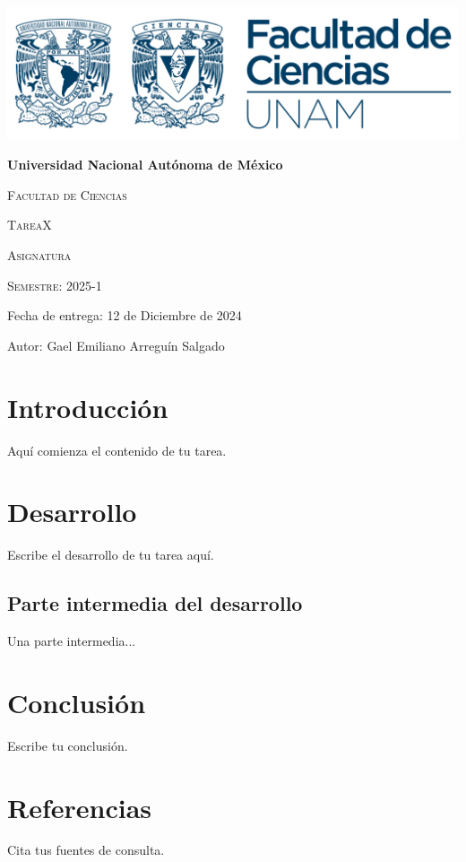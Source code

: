 \documentclass[a4paper, 12pt]{article} %
\newcommand{\makecoverpage}[5]{
  \begin{titlepage}
    \begin{center}
      {\includegraphics[width=1\textwidth]{UNAM_FCLogo}\par}
      \vspace{1cm}
      {\bfseries \huge Universidad Nacional Autónoma de México \par}
      \vspace{2cm}
      {\scshape \huge Facultad de Ciencias \par}
      \vspace{2cm}
      {\scshape \huge #1 \par} %
      \vspace{2cm}
      {\scshape \large #2 \par} %
      \vfill
      {\scshape \large Semestre: #3 \par}
      \vspace{1.5cm}
      {\large Fecha de entrega: #4 \par}
      \vspace{1.5cm}
      {\large Autor: #5 \par}
      \vfill
    \end{center}
  \end{titlepage}
}
\begin{document}
\makecoverpage{TareaX}
              {Asignatura}              
              {2025-1}              
              {12 de Diciembre de 2024}              
              {Gael Emiliano Arreguín Salgado}

\tableofcontents %
\newpage

\section{Introducción}
Aquí comienza el contenido de tu tarea.

\section{Desarrollo}
Escribe el desarrollo de tu tarea aquí.

\subsection{Parte intermedia del desarrollo}
Una parte intermedia...

\section{Conclusión}
Escribe tu conclusión.

\section{Referencias}
Cita tus fuentes de consulta.
\end{document}
